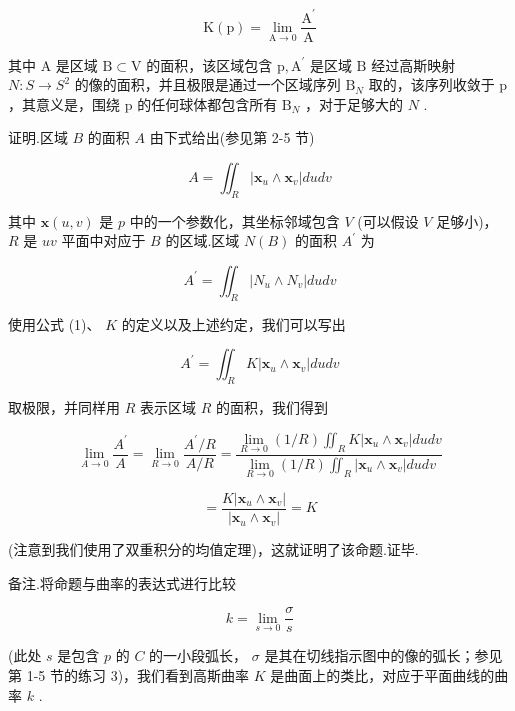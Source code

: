 \[
\mathrm{K}\left( \mathrm{p}\right)  = \mathop{\lim }\limits_{{\mathrm{A} \rightarrow  0}}\frac{{\mathrm{A}}^{\prime }}{\mathrm{A}}
\]

其中 \(\mathrm{A}\) 是区域 \(\mathrm{B} \subset  \mathrm{V}\) 的面积，该区域包含 \(\mathrm{p},{\mathrm{A}}^{\prime }\) 是区域 \(\mathrm{B}\) 经过高斯映射 \(N : S \rightarrow  {S}^{2}\) 的像的面积，并且极限是通过一个区域序列 \({\mathrm{B}}_{N}\) 取的，该序列收敛于 \(\mathrm{p}\) ，其意义是，围绕 \(\mathrm{p}\) 的任何球体都包含所有 \({\mathrm{B}}_{N}\) ，对于足够大的 \(N\) .

证明.区域 \(B\) 的面积 \(A\) 由下式给出(参见第 2-5 节)

\[
A = {\iint }_{R}\left| {{\mathbf{x}}_{u} \land  {\mathbf{x}}_{v}}\right| {dudv}
\]

其中 \(\mathbf{x}\left( {u,v}\right)\) 是 \(p\) 中的一个参数化，其坐标邻域包含 \(V\) (可以假设 \(V\) 足够小)， \(R\) 是 \({uv}\) 平面中对应于 \(B\) 的区域.区域 \(N\left( B\right)\) 的面积 \({A}^{\prime }\) 为

\[
{A}^{\prime } = {\iint }_{R}\left| {{N}_{u} \land  {N}_{v}}\right| {dudv}
\]

使用公式 (1)、 \(K\) 的定义以及上述约定，我们可以写出

\[
{A}^{\prime } = {\iint }_{R}K\left| {{\mathbf{x}}_{u} \land  {\mathbf{x}}_{v}}\right| {dudv} \tag{12}
\]

取极限，并同样用 \(R\) 表示区域 \(R\) 的面积，我们得到

\[
\mathop{\lim }\limits_{{A \rightarrow  0}}\frac{{A}^{\prime }}{A} = \mathop{\lim }\limits_{{R \rightarrow  0}}\frac{{A}^{\prime }/R}{A/R} = \frac{\mathop{\lim }\limits_{{R \rightarrow  0}}\left( {1/R}\right) {\iint }_{R}K\left| {{\mathbf{x}}_{u} \land  {\mathbf{x}}_{v}}\right| {dudv}}{\mathop{\lim }\limits_{{R \rightarrow  0}}\left( {1/R}\right) {\iint }_{R}\left| {{\mathbf{x}}_{u} \land  {\mathbf{x}}_{v}}\right| {dudv}}
\]

\[
= \frac{K\left| {{\mathbf{x}}_{u} \land  {\mathbf{x}}_{v}}\right| }{\left| {\mathbf{x}}_{u} \land  {\mathbf{x}}_{v}\right| } = K
\]

(注意到我们使用了双重积分的均值定理)，这就证明了该命题.证毕.

备注.将命题与曲率的表达式进行比较

\[
k = \mathop{\lim }\limits_{{s \rightarrow  0}}\frac{\sigma }{s}
\]

(此处 \(s\) 是包含 \(p\) 的 \(C\) 的一小段弧长， \(\sigma\) 是其在切线指示图中的像的弧长；参见第 1-5 节的练习 3)，我们看到高斯曲率 \(K\) 是曲面上的类比，对应于平面曲线的曲率 \(k\) .

